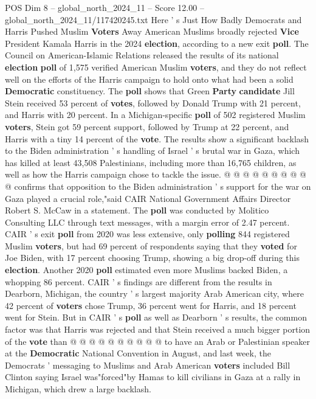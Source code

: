 \begin{textsample}{POS Dim 8 – global\_north\_2024\_11 – Score 12.00 – global\_north\_2024\_11/117420245.txt}  \label{ex:f8_pos_153}
Here ' s Just How Badly Democrats and Harris Pushed Muslim \textbf{Voters} Away American Muslims broadly rejected \textbf{Vice} President Kamala Harris in the 2024 \textbf{election}, according to a new exit \textbf{poll}.
The Council on American-Islamic Relations released the results of its national \textbf{election} \textbf{poll} of 1,575 verified American Muslim \textbf{voters}, and they do not reflect well on the efforts of the Harris campaign to hold onto what had been a solid \textbf{Democratic} constituency.
The \textbf{poll} shows that Green \textbf{Party} \textbf{candidate} Jill Stein received 53 percent of \textbf{votes}, followed by Donald Trump with 21 percent, and Harris with 20 percent.
In a Michigan-specific \textbf{poll} of 502 registered Muslim \textbf{voters}, Stein got 59 percent support, followed by Trump at 22 percent, and Harris with a tiny 14 percent of the \textbf{vote}.
The results show a significant backlash to the Biden administration ' s handling of Israel ' s brutal war in Gaza, which has killed at least 43,508 Palestinians, including more than 16,765 children, as well as how the Harris campaign chose to tackle the issue. @ @ @ @ @ @ @ @ @ @ confirms that opposition to the Biden administration ' s support for the war on Gaza played a crucial role,"said CAIR National Government Affairs Director Robert S.
McCaw in a statement.
The \textbf{poll} was conducted by Molitico Consulting LLC through text messages, with a margin error of 2.47 percent.
CAIR ' s exit \textbf{poll} from 2020 was less extensive, only \textbf{polling} 844 registered Muslim \textbf{voters}, but had 69 percent of respondents saying that they \textbf{voted} for Joe Biden, with 17 percent choosing Trump, showing a big drop-off during this \textbf{election}.
Another 2020 \textbf{poll} estimated even more Muslims backed Biden, a whopping 86 percent.
CAIR ' s findings are different from the results in Dearborn, Michigan, the country ' s largest majority Arab American city, where 42 percent of \textbf{voters} chose Trump, 36 percent went for Harris, and 18 percent went for Stein.
But in CAIR ' s \textbf{poll} as well as Dearborn ' s results, the common factor was that Harris was rejected and that Stein received a much bigger portion of the \textbf{vote} than @ @ @ @ @ @ @ @ @ @ to have an Arab or Palestinian speaker at the \textbf{Democratic} National Convention in August, and last week, the Democrats ' messaging to Muslims and Arab American \textbf{voters} included Bill Clinton saying Israel was"forced"by Hamas to kill civilians in Gaza at a rally in Michigan, which drew a large backlash.

\end{textsample}
